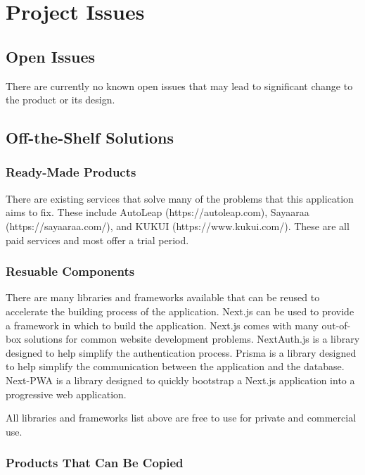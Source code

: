 \documentclass[12pt]{article}
\begin{document}
\section{Project Issues}

\subsection{Open Issues}

There are currently no known open issues that may lead to significant change to the product or its
design.

\subsection{Off-the-Shelf Solutions}

\subsubsection{Ready-Made Products}

There are existing services that solve many of the problems that this application aims to fix.
These include AutoLeap (https://autoleap.com), Sayaaraa (https://sayaaraa.com/), and KUKUI
(https://www.kukui.com/). These are all paid services and most offer a trial period.

\subsubsection{Resuable Components}

There are many libraries and frameworks available that can be reused to accelerate the building
process of the application. Next.js can be used to provide a framework in which to build the
application. Next.js comes with many out-of-box solutions for common website development problems.
NextAuth.js is a library designed to help simplify the authentication process. Prisma is a library
designed to help simplify the communication between the application and the database. Next-PWA is a
library designed to quickly bootstrap a Next.js application into a progressive web application.

All libraries and frameworks list above are free to use for private and commercial use.

\subsubsection{Products That Can Be Copied}
\end{document}
